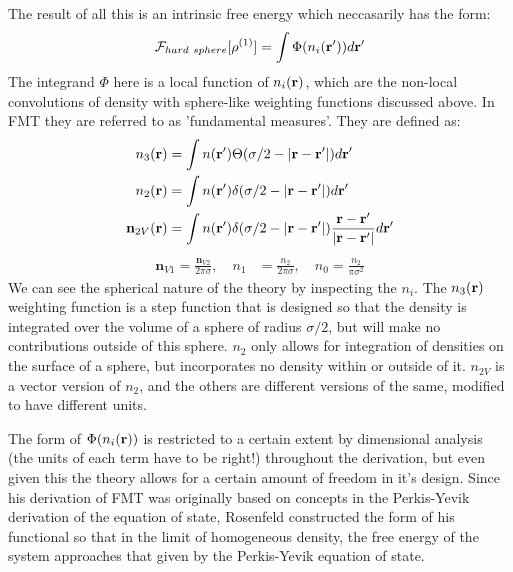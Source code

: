 The result of all this is an intrinsic free energy which neccasarily has the form:
\begin{align}
  \label{eq:F-FMT-form}
  \mathcal{F}_{hard~sphere}[\rho^{(1)}] = \int \Phi({n_i(\textbf{r}')})d\textbf{r}'
\end{align}
The integrand $\Phi$ here is a local function of $n_i(\textbf{r})$, which are the non-local convolutions of density with sphere-like weighting functions discussed above.  In FMT they are referred to as 'fundamental measures'.  They are defined as:
\begin{align}
  n_3(\textbf{r}) &= \int n(\textbf{r}') \Theta(\sigma/2 -\left|\textbf{r} - \textbf{r}'\right|)
  d\textbf{r}' \label{eq:FMn3} \\
  n_2(\textbf{r}) &= \int n(\textbf{r}') \delta(\sigma/2 -\left|\textbf{r} - \textbf{r}'\right|) d\textbf{r}' \\
  \mathbf{n}_{2V}(\textbf{r}) &= \int n(\textbf{r}') \delta(\sigma/2 -\left|\textbf{r} - \textbf{r}'\right|) \frac{\textbf{r}-\textbf{r}'}{|\textbf{r}-\textbf{r}'|}d\textbf{r}'
\end{align}
\begin{align}
  \mathbf{n}_{V1} = \frac{\mathbf{n}_{V2}}{2\pi \sigma}, \quad
  n_1 &= \frac{n_2}{2\pi \sigma} , \quad
  n_0 = \frac{n_2}{\pi \sigma^2} \label{eq:FMrest}
\end{align}
We can see the spherical nature of the theory by inspecting the $n_i$.  The $n_3(\textbf{r})$ weighting function is a step function that is designed so that the density is integrated over the volume of a sphere of radius $\sigma/2$, but will make no contributions outside of this sphere.  $n_2$ only allows for integration of densities on the surface of a sphere, but incorporates no density within or outside of it.  $n_{2V}$ is a vector version of $n_2$, and the others are different versions of the same, modified to have different units. 
  
The form of $\Phi({n_i(\textbf{r})})$ is restricted to a certain extent by dimensional analysis (the units of each term have to be right!) throughout the derivation, but even given this the theory allows for a certain amount of freedom in it's design.  Since his derivation of FMT was originally based on concepts in the Perkis-Yevik derivation of the equation of state, Rosenfeld constructed the form of his functional so that in the limit of homogeneous density, the free energy of the system approaches that given by the Perkis-Yevik equation of state.  

